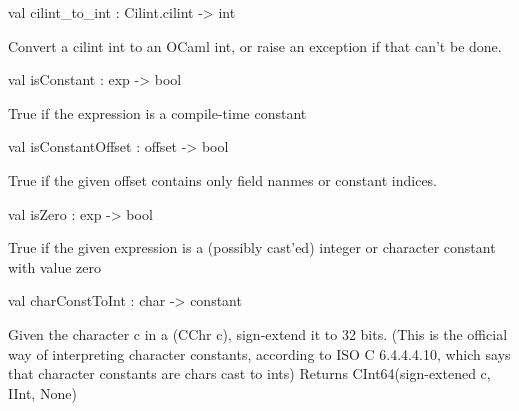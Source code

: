 \documentclass[11pt]{article}
\begin{document}
\label{val:Cil.cilint-underscoreto-underscoreint}\begin{ocamldoccode}
val cilint_to_int : Cilint.cilint -> int
\end{ocamldoccode}
\begin{ocamldocdescription}
Convert a cilint int to an OCaml int, or raise an exception if that
    can't be done.


\end{ocamldocdescription}




\label{val:Cil.isConstant}\begin{ocamldoccode}
val isConstant : exp -> bool
\end{ocamldoccode}
\begin{ocamldocdescription}
True if the expression is a compile-time constant


\end{ocamldocdescription}




\label{val:Cil.isConstantOffset}\begin{ocamldoccode}
val isConstantOffset : offset -> bool
\end{ocamldoccode}
\begin{ocamldocdescription}
True if the given offset contains only field nanmes or constant indices.


\end{ocamldocdescription}




\label{val:Cil.isZero}\begin{ocamldoccode}
val isZero : exp -> bool
\end{ocamldoccode}
\begin{ocamldocdescription}
True if the given expression is a (possibly cast'ed) integer or character 
    constant with value zero


\end{ocamldocdescription}




\label{val:Cil.charConstToInt}\begin{ocamldoccode}
val charConstToInt : char -> constant
\end{ocamldoccode}
\begin{ocamldocdescription}
Given the character c in a (CChr c), sign-extend it to 32 bits.
  (This is the official way of interpreting character constants, according to
  ISO C 6.4.4.4.10, which says that character constants are chars cast to ints)
  Returns CInt64(sign-extened c, IInt, None)


\end{ocamldocdescription}
\end{document}
